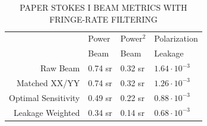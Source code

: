 \documentclass[twocolumn,apj,numberedappendix]{emulateapj}
\begin{document}
\begin{table}[ht]
\caption{PAPER STOKES I BEAM METRICS WITH FRINGE-RATE FILTERING}
\begin{center}
\begin{tabular}{rlll}
& Power & Power$^2$ & Polarization \\
& Beam & Beam & Leakage\\
\hline
Raw Beam & 0.74 sr & 0.32 sr & $1.64\cdot10^{-3}$ \\
Matched XX/YY & 0.74 sr & 0.32 sr & $1.26\cdot10^{-3}$ \\
Optimal Sensitivity & 0.49 sr & 0.22 sr & $0.88\cdot10^{-3}$ \\
Leakage Weighted & 0.34 sr & 0.14 sr & $0.68\cdot10^{-3}$ \\
\end{tabular}
\end{center}
\label{tbl:beam_metrics}
\end{table}%
\end{document}
